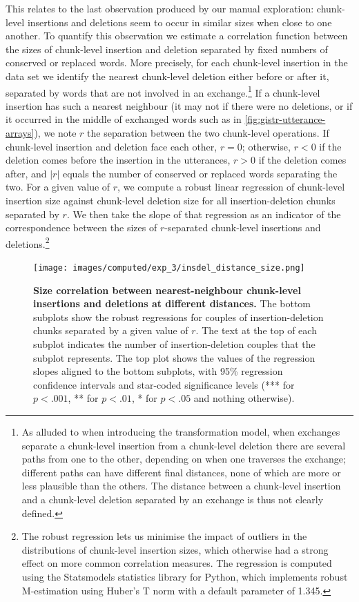 \documentclass[a4paper,fleqn]{cas-dc}
\begin{document}
This relates to the last observation produced by our manual exploration:
chunk-level insertions and deletions seem to occur in similar sizes when
close to one another. To quantify this observation we estimate a
correlation function between the sizes of chunk-level insertion and
deletion separated by fixed numbers of conserved or replaced words. More
precisely, for each chunk-level insertion in the data set we identify
the nearest chunk-level deletion either before or after it, separated by
words that are not involved in an exchange.\footnote{As alluded to when
  introducing the transformation model, when exchanges separate a
  chunk-level insertion from a chunk-level deletion there are several
  paths from one to the other, depending on when one traverses the
  exchange; different paths can have different final distances, none of
  which are more or less plausible than the others. The distance between
  a chunk-level insertion and a chunk-level deletion separated by an
  exchange is thus not clearly defined.} If a chunk-level insertion has
such a nearest neighbour (it may not if there were no deletions, or if
it occurred in the middle of exchanged words such as in
\cref{fig:gistr-utterance-arrays}), we note \(r\) the separation between
the two chunk-level operations. If chunk-level insertion and deletion
face each other, \(r = 0\); otherwise, \(r < 0\) if the deletion comes
before the insertion in the utterances, \(r > 0\) if the deletion comes
after, and \(|r|\) equals the number of conserved or replaced words
separating the two. For a given value of \(r\), we compute a robust
linear regression of chunk-level insertion size against chunk-level
deletion size for all insertion-deletion chunks separated by \(r\). We
then take the slope of that regression as an indicator of the
correspondence between the sizes of \(r\)-separated chunk-level
insertions and deletions.\footnote{The robust regression lets us
  minimise the impact of outliers in the distributions of chunk-level
  insertion sizes, which otherwise had a strong effect on more common
  correlation measures. The regression is computed using the Statsmodels
  statistics library for Python, which implements robust M-estimation
  using Huber's T norm \citep{huber_robust_1981} with a default
  parameter of 1.345.}

\begin{figure}
  \centering
  \texttt{[image: images/computed/exp\_3/insdel\_distance\_size.png]}
  \caption[Size correlation between nearest-neighbour chunk-level insertions and deletions at different distances]{
  \textbf{Size correlation between nearest-neighbour chunk-level insertions and deletions at different distances.}
  The bottom subplots show the robust regressions for couples of insertion-deletion chunks separated by a given value of $r$.
  The text at the top of each subplot indicates the number of insertion-deletion couples that the subplot represents.
  The top plot shows the values of the regression slopes aligned to the bottom subplots, with 95\% regression confidence intervals and star-coded significance levels (*** for $p < .001$, ** for $p < .01$, * for $p < .05$ and nothing otherwise).
  }
  \label{fig:gistr-insdel-correlations}
\end{figure}
\end{document}
